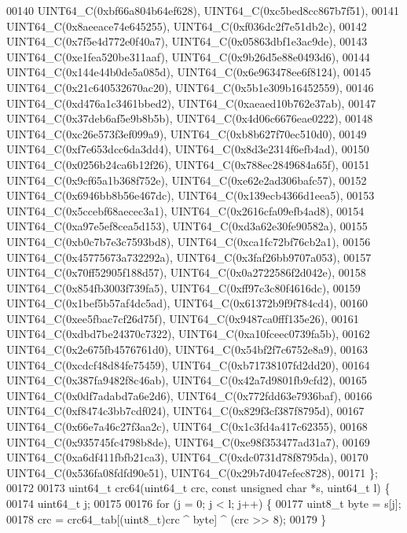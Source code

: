 \begin{DoxyCode}
00140     UINT64\_C(0xbf66a804b64ef628), UINT64\_C(0xc5bed8cc867b7f51),
00141     UINT64\_C(0x8aeeace74e645255), UINT64\_C(0xf036dc2f7e51db2c),
00142     UINT64\_C(0x7f5e4d772e0f40a7), UINT64\_C(0x05863dbf1e3ac9de),
00143     UINT64\_C(0xe1fea520be311aaf), UINT64\_C(0x9b26d5e88e0493d6),
00144     UINT64\_C(0x144e44b0de5a085d), UINT64\_C(0x6e963478ee6f8124),
00145     UINT64\_C(0x21c640532670ac20), UINT64\_C(0x5b1e309b16452559),
00146     UINT64\_C(0xd476a1c3461bbed2), UINT64\_C(0xaeaed10b762e37ab),
00147     UINT64\_C(0x37deb6af5e9b8b5b), UINT64\_C(0x4d06c6676eae0222),
00148     UINT64\_C(0xc26e573f3ef099a9), UINT64\_C(0xb8b627f70ec510d0),
00149     UINT64\_C(0xf7e653dcc6da3dd4), UINT64\_C(0x8d3e2314f6efb4ad),
00150     UINT64\_C(0x0256b24ca6b12f26), UINT64\_C(0x788ec2849684a65f),
00151     UINT64\_C(0x9cf65a1b368f752e), UINT64\_C(0xe62e2ad306bafc57),
00152     UINT64\_C(0x6946bb8b56e467dc), UINT64\_C(0x139ecb4366d1eea5),
00153     UINT64\_C(0x5ccebf68aecec3a1), UINT64\_C(0x2616cfa09efb4ad8),
00154     UINT64\_C(0xa97e5ef8cea5d153), UINT64\_C(0xd3a62e30fe90582a),
00155     UINT64\_C(0xb0c7b7e3c7593bd8), UINT64\_C(0xca1fc72bf76cb2a1),
00156     UINT64\_C(0x45775673a732292a), UINT64\_C(0x3faf26bb9707a053),
00157     UINT64\_C(0x70ff52905f188d57), UINT64\_C(0x0a2722586f2d042e),
00158     UINT64\_C(0x854fb3003f739fa5), UINT64\_C(0xff97c3c80f4616dc),
00159     UINT64\_C(0x1bef5b57af4dc5ad), UINT64\_C(0x61372b9f9f784cd4),
00160     UINT64\_C(0xee5fbac7cf26d75f), UINT64\_C(0x9487ca0fff135e26),
00161     UINT64\_C(0xdbd7be24370c7322), UINT64\_C(0xa10fceec0739fa5b),
00162     UINT64\_C(0x2e675fb4576761d0), UINT64\_C(0x54bf2f7c6752e8a9),
00163     UINT64\_C(0xcdcf48d84fe75459), UINT64\_C(0xb71738107fd2dd20),
00164     UINT64\_C(0x387fa9482f8c46ab), UINT64\_C(0x42a7d9801fb9cfd2),
00165     UINT64\_C(0x0df7adabd7a6e2d6), UINT64\_C(0x772fdd63e7936baf),
00166     UINT64\_C(0xf8474c3bb7cdf024), UINT64\_C(0x829f3cf387f8795d),
00167     UINT64\_C(0x66e7a46c27f3aa2c), UINT64\_C(0x1c3fd4a417c62355),
00168     UINT64\_C(0x935745fc4798b8de), UINT64\_C(0xe98f353477ad31a7),
00169     UINT64\_C(0xa6df411fbfb21ca3), UINT64\_C(0xdc0731d78f8795da),
00170     UINT64\_C(0x536fa08fdfd90e51), UINT64\_C(0x29b7d047efec8728),
00171 \};
00172 
00173 uint64\_t crc64(uint64\_t crc, \textcolor{keyword}{const} \textcolor{keywordtype}{unsigned} \textcolor{keywordtype}{char} *s, uint64\_t l) \{
00174     uint64\_t j;
00175 
00176     \textcolor{keywordflow}{for} (j = 0; j < l; j++) \{
00177         uint8\_t byte = s[j];
00178         crc = crc64\_tab[(uint8\_t)crc ^ byte] ^ (crc >> 8);
00179     \}

\end{DoxyCode}
